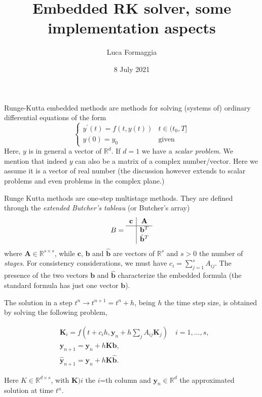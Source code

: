 \documentclass[10pt,a4paper,twoside]{article}
\title{Embedded RK solver, some implementation aspects}
\author{Luca Formaggia}
\date{8 July 2021}
\begin{document}
    \maketitle
    
    Runge-Kutta embedded methods are methods for solving (systems of) ordinary differential equations of the form
    \[
    \begin{cases}
    y^\prime(t)=f(t,y(t)) & t\in (t_0,T]\\
    y(0)=y_0 & \text{given}
    \end{cases}
    \]
Here, $y$ is in general a vector of $\mathbb{R}^d$. If $d=1$ we have a \emph{scalar problem}.
We mention that indeed $y$ can also be a matrix of a complex number/vector. Here we assume it is a vector of real number (the discussion however extends to scalar problems and even problems in the complex plane.)


Runge Kutta methods are one-step multistage methods. They are defined through the \emph{extended Butcher's tableau} (or Butcher's array)
\[
B=\begin{array}{c|c}
\mathbf{c}& \mathbf{A}\\
\hline
& \mathbf{b}^T\\
& \hat{\mathbf{b}}^T
\end{array}
\]
where $\mathbf{A}\in\mathbb{R}^{s\times s}$, while $\mathbf{c}$, $\mathbf{b}$ and $\hat{\mathbf{b}}$ are vectors of $\mathbb{R}^s$ and $s>0$ the number of \emph{stages}.
For consistency considerations, we must have $c_i=\sum_{j=1}^s A_{ij}$.
The presence of the two vectors $\mathbf{b}$ and $\hat{\mathbf{b}}$ characterize the embedded formula (the standard formula has just one vector $\mathbf{b}$).


The solution in a step $t^n\to t^{n+1}=t^n+h$, being $h$ the time step size, is obtained by solving the following problem,

\begin{align}\label{eq:rk1}
&\mathbf{K}_i = f(t+c_ih,\mathbf{y}_n+h\sum_j A_{ij}\mathbf{K}_j)\quad i=1,\ldots,s,\\
\label{eq:rkt}
&\mathbf{y}_{n+1}=\mathbf{y}_n + h \mathbf{K}\mathbf{b},\\\label{eq:rk3}
&\hat{\mathbf{y}}_{n+1}=\mathbf{y}_n + h \mathbf{K}\hat{\mathbf{b}}.
\end{align}

Here $K\in\mathbb{R}^{d\times s}$, with $\mathbf{K})i$ the $i$=th column and $\mathbf{y}_n\in\mathbb{R}^d$ the approximated solution at time $t^n$.
\end{document}
